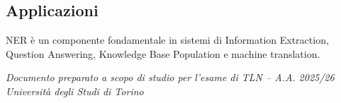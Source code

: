 \documentclass[12pt,a4paper]{article}
\begin{document}
\subsection{Applicazioni}
NER è un componente fondamentale in sistemi di Information Extraction, Question Answering, Knowledge Base Population e machine translation.

\vfill
\begin{center}
\color{darkgray}\small\itshape
Documento preparato a scopo di studio per l'esame di TLN -- A.A. 2025/26\\
Università degli Studi di Torino
\end{center}
\end{document}
